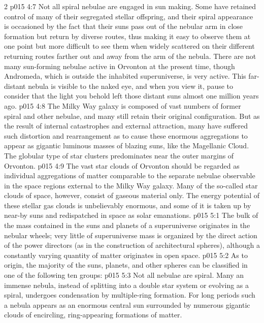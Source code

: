 \begin{multicols}{2}
\vs p015 4:7 Not all spiral nebulae are engaged in sun making. Some have retained control of many of their segregated stellar offspring, and their spiral appearance is occasioned by the fact that their suns pass out of the nebular arm in close formation but return by diverse routes, thus making it easy to observe them at one point but more difficult to see them when widely scattered on their different returning routes farther out and away from the arm of the nebula. There are not many sun\hyp{}forming nebulae active in Orvonton at the present time, though Andromeda, which is outside the inhabited superuniverse, is very active. This far\hyp{}distant nebula is visible to the naked eye, and when you view it, pause to consider that the light you behold left those distant suns almost one million years ago.
\vs p015 4:8 The Milky Way galaxy is composed of vast numbers of former spiral and other nebulae, and many still retain their original configuration. But as the result of internal catastrophes and external attraction, many have suffered such distortion and rearrangement as to cause these enormous aggregations to appear as gigantic luminous masses of blazing suns, like the Magellanic Cloud. The globular type of star clusters predominates near the outer margins of Orvonton.
\vs p015 4:9 The vast star clouds of Orvonton should be regarded as individual aggregations of matter comparable to the separate nebulae observable in the space regions external to the Milky Way galaxy. Many of the so\hyp{}called star clouds of space, however, consist of gaseous material only. The energy potential of these stellar gas clouds is unbelievably enormous, and some of it is taken up by near\hyp{}by suns and redispatched in space as solar emanations.
\vs p015 5:1 The bulk of the mass contained in the suns and planets of a superuniverse originates in the nebular wheels; very little of superuniverse mass is organized by the direct action of the power directors (as in the construction of architectural spheres), although a constantly varying quantity of matter originates in open space.
\vs p015 5:2 As to origin, the majority of the suns, planets, and other spheres can be classified in one of the following ten groups:
\pc \vs p015 5:3 \bibnobreakspace {} Not all nebulae are spiral. Many an immense nebula, instead of splitting into a double star system or evolving as a spiral, undergoes condensation by multiple\hyp{}ring formation. For long periods such a nebula appears as an enormous central sun surrounded by numerous gigantic clouds of encircling, ring\hyp{}appearing formations of matter.

\end{multicols}
